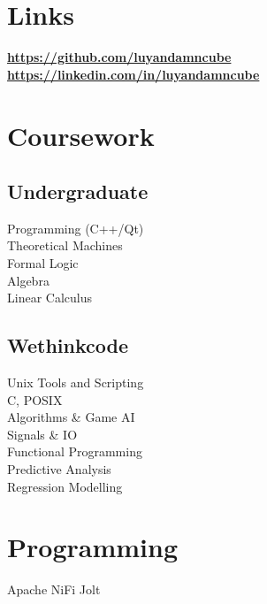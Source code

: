 \documentclass[]{deedy-resume-openfont}
\begin{document}
\begin{minipage}[t]{0.33\textwidth}

\section{Links} 
\href{https://github.com/luyandamncube }{\bf https://github.com/luyandamncube } \\
\href{https://www.linkedin.com/in/luyandamncube}{\bf https://linkedin.com/in/luyandamncube} \\


\section{Coursework}
\subsection{Undergraduate}
Programming (C++/Qt) \\
Theoretical Machines \\
Formal Logic \\
Algebra \\
Linear Calculus \\
\sectionsep

\subsection{Wethinkcode}
Unix Tools and Scripting \\
C, POSIX \\
Algorithms \& Game AI\\
Signals \& IO\\
Functional Programming \\
Predictive Analysis \\
Regression Modelling \\
\sectionsep
\sectionsep


\section{Programming}
\textbullet{} Apache NiFi \textbullet{} Jolt  \\


\end{minipage}
\end{document}
